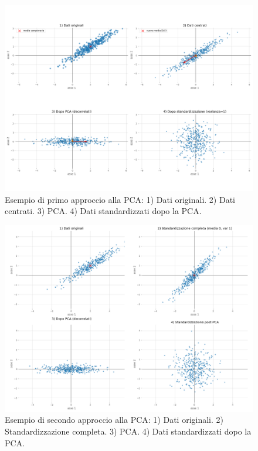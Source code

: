 \begin{figure}[H]
    \centering
    \includegraphics[width=\textwidth]{images/th_10_12/pca_progressione1.png}
    \caption{Esempio di primo approccio alla PCA: 1) Dati originali. 2) Dati centrati. 3) PCA. 4) Dati standardizzati dopo la PCA.}
    \label{fig:pca_progressione1}
\end{figure}

\begin{figure}[H]
    \centering
    \includegraphics[width=\textwidth]{images/th_10_12/pca_progressione2.png}
    \caption{Esempio di secondo approccio alla PCA: 1) Dati originali. 2) Standardizzazione completa. 3) PCA. 4) Dati standardizzati dopo la PCA.}
    \label{fig:pca_progressione2}
\end{figure}

